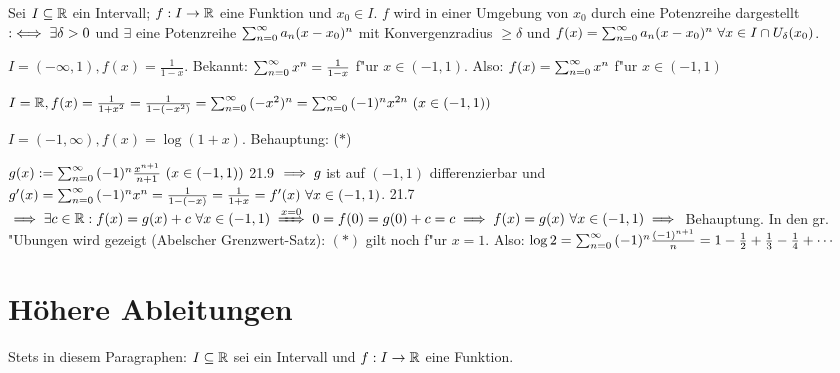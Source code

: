 \documentclass[a4paper,twoside,DIV15,BCOR12mm]{scrbook}
\begin{document}
\begin{definition}
Sei $I \subseteq \mathbb{R}$ ein Intervall; $f:I\to\mathbb{R}$ eine Funktion und $x_0\in I$. $f$ wird in einer Umgebung von $x_0$ durch eine Potenzreihe dargestellt $:\iff \exists \delta>0$ und $\exists$ eine Potenzreihe $\sum_{n=0}^{\infty}{a_n(x-x_0)^n}$ mit Konvergenzradius $\ge \delta$ und $f(x)=\sum_{n=0}^{\infty}{a_n(x-x_0)^n}\ \forall x \in I \cap U_{\delta}(x_0)$.
\end{definition}

\begin{beispiele}
\item $I=(-\infty, 1), f(x)=\frac{1}{1-x}.$ Bekannt: $\sum_{n=0}^{\infty}{x^n}=\frac{1}{1-x}$ f"ur $x \in (-1, 1)$. Also: $f(x)=\sum_{n=0}^{\infty}{x^n}$ f"ur $x \in (-1, 1)$
\item $I=\MdR, f(x)=\frac{1}{1+x^2}=\frac{1}{1-(-x^2)}=\reihenull{(-x^2)^n}=\reihenull{(-1)^nx^{2n}}\ (x\in(-1, 1))$
\item $I=(-1, \infty), f(x)=\log(1+x).$ Behauptung: ($*$) \\
\begin{beweis}
$g(x):=\sum_{n=0}^{\infty}{(-1)^n\frac{x^{n+1}}{n+1}}\ (x \in (-1, 1))$ 21.9 $\implies g$ ist auf $(-1, 1)$ differenzierbar und $g'(x)=\reihenull{(-1)^nx^n}=\frac{1}{1-(-x)}=\frac{1}{1+x}=f'(x)\ \forall x \in (-1, 1)$. 21.7 $\folgt \exists c \in \MdR: f(x)=g(x)+c\ \forall x \in (-1, 1) \folgtwegen{x=0}0=f(0)=g(0)+c=c\folgt f(x)=g(x)\ \forall x \in (-1, 1) \folgt$ Behauptung.
In den gr. "Ubungen wird gezeigt (Abelscher Grenzwert-Satz): $(*)$ gilt noch f"ur $x=1$. Also: $\log 2=\sum_{n=0}^{\infty}{(-1)^n\frac{(-1)^{n+1}}{n}}=1-\frac{1}{2}+\frac{1}{3}-\frac{1}{4}+\cdots$
\end{beweis}
\end{beispiele}


\chapter{Höhere Ableitungen}

Stets in diesem Paragraphen: $I \subseteq \mathbb{R}$ sei ein Intervall und $f: I \to \mathbb{R}$ eine Funktion.
\end{document}
